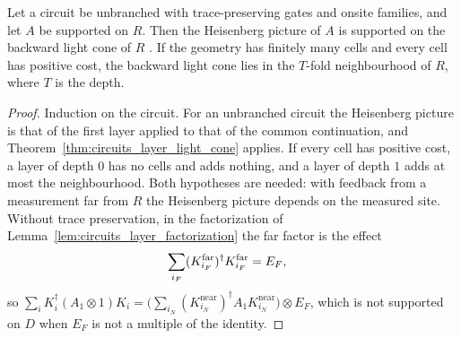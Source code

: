 \begin{theorem}
    \label{thm:circuits_light_cone}
    \leanok
    Let a circuit be unbranched with trace-preserving gates and onsite families, and
    let $A$ be supported on $R$. Then the Heisenberg picture of $A$ is supported on
    the backward light cone of $R$
    \cite{BravyiHastingsVerstraete2006LiebRobinson}. If the geometry has finitely
    many cells and every cell has positive cost, the backward light cone lies in the $T$-fold neighbourhood of $R$, where
    $T$ is the depth.
\end{theorem}
\begin{proof}\leanok
    Induction on the circuit. For an unbranched circuit the Heisenberg picture is
    that of the first layer applied to that of the common continuation, and
    Theorem~\ref{thm:circuits_layer_light_cone} applies. If every cell has positive
    cost, a layer of depth $0$ has no cells and adds nothing, and a layer of depth
    $1$ adds at most the neighbourhood. Both hypotheses are needed: with feedback
    from a measurement far from $R$ the Heisenberg picture depends on the measured
    site. Without trace preservation, in the factorization of
    Lemma~\ref{lem:circuits_layer_factorization} the far factor is the effect
    \begin{align}
        \sum_{i_F}(K^{\mathrm{far}}_{i_F})^\dagger K^{\mathrm{far}}_{i_F}&=E_F,
        \notag
    \end{align}
    so $\sum_iK_i^\dagger(A_1\otimes1)K_i
    =\bigl(\sum_{i_N}(K^{\mathrm{near}}_{i_N})^\dagger A_1K^{\mathrm{near}}_{i_N}\bigr)
    \otimes E_F$, which is not supported on $D$ when $E_F$ is not a multiple of the
    identity.
\end{proof}


